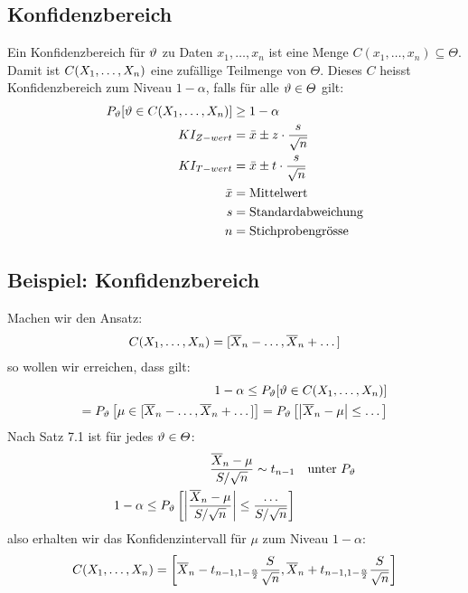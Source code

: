 \subsection{Konfidenzbereich}
Ein Konfidenzbereich für $\vartheta$ zu Daten $x_1, \dots, x_n$ ist eine Menge $C
  (x_1, \dots, x_n) \subseteq \varTheta$. Damit ist $C (X_1, \dots, X_n)$ eine
zufällige Teilmenge von $\varTheta$. Dieses $C$ heisst Konfidenzbereich zum
Niveau $1 - \alpha$, falls für alle $\vartheta \in \varTheta$ gilt:
\begin{align*}
  P_\vartheta [\vartheta \in C (X_1, \dots, X_n)] & \geq 1 - \alpha                          \\
  KI_{Z-wert}                           & = \bar{x} \pm z \cdot \frac{s}{\sqrt{n}} \\
  KI_{T-wert}                           & = \bar{x} \pm t \cdot \frac{s}{\sqrt{n}} \\
  \bar{x}                               & = \text{Mittelwert}                      \\
  s                                     & = \text{Standardabweichung}              \\
  n                                     & = \text{Stichprobengrösse}               \\
\end{align*}

\BoxStart{}
\subsection{Beispiel: Konfidenzbereich}
Machen wir den Ansatz:
\begin{align*}
  C (X_1, \dots, X_n) = [\overline{X}_n - \dots, \overline{X}_n + \dots]
\end{align*}
so wollen wir erreichen, dass gilt:
\begin{align*}
  1 - \alpha \leq P_\vartheta[\vartheta \in  C (X_1, \dots, X_n)] \\
  = P_\vartheta \left[ \mu \in [\overline{X}_n - \dots, \overline{X}_n + \dots] \right]
  = P_\vartheta \left[ \abs{\overline{X}_n - \mu} \leq \dots \right]
\end{align*}
Nach Satz 7.1 ist für jedes $\vartheta \in \varTheta$:
\begin{align*}
  \frac{\overline{X}_n - \mu}{S / \sqrt{n}} \sim t_{n-1} &  & \text{unter } P_\vartheta \\
  1 - \alpha \leq P_\vartheta \left[ \abs{\frac{\overline{X}_n - \mu}{S / \sqrt{n}}} \leq \frac{\dots}{S / \sqrt{n}} \right]
\end{align*}
also erhalten wir das Konfidenzintervall für $\mu$ zum Niveau $1 - \alpha$:
\begin{align*}
  C (X_1, \dots, X_n) = \left[ \overline{X}_n - t_{n-1, 1 - \frac{\alpha}{2}} \frac{S}{\sqrt{n}}, \overline{X}_n + t_{n-1, 1 - \frac{\alpha}{2}} \frac{S}{\sqrt{n}} \right]
\end{align*}
\BoxEnd{}
